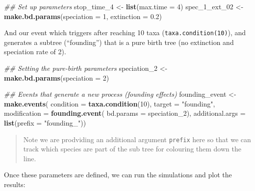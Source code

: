 \documentclass[
]{book}
\newenvironment{Shaded}{\begin{snugshade}}{\end{snugshade}}
\newcommand{\CommentTok}[1]{\textcolor[rgb]{0.56,0.35,0.01}{\textit{#1}}}
\newcommand{\DataTypeTok}[1]{\textcolor[rgb]{0.13,0.29,0.53}{#1}}
\newcommand{\DecValTok}[1]{\textcolor[rgb]{0.00,0.00,0.81}{#1}}
\newcommand{\FloatTok}[1]{\textcolor[rgb]{0.00,0.00,0.81}{#1}}
\newcommand{\KeywordTok}[1]{\textcolor[rgb]{0.13,0.29,0.53}{\textbf{#1}}}
\newcommand{\NormalTok}[1]{#1}
\newcommand{\StringTok}[1]{\textcolor[rgb]{0.31,0.60,0.02}{#1}}
\begin{document}
\begin{Shaded}
\begin{Highlighting}[]
\CommentTok{\#\# Set up parameters}
\NormalTok{stop\_time\_}\DecValTok{4}\NormalTok{ \textless{}{-}}\StringTok{ }\KeywordTok{list}\NormalTok{(}\DataTypeTok{max.time =} \DecValTok{4}\NormalTok{)}
\NormalTok{spec\_}\DecValTok{1}\NormalTok{\_ext\_}\DecValTok{02}\NormalTok{ \textless{}{-}}\StringTok{ }\KeywordTok{make.bd.params}\NormalTok{(}\DataTypeTok{speciation =} \DecValTok{1}\NormalTok{, }\DataTypeTok{extinction =} \FloatTok{0.2}\NormalTok{)}
\end{Highlighting}
\end{Shaded}

And our event which triggers after reaching 10 taxa (\texttt{taxa.condition(10)}), and generates a subtree (``founding'') that is a pure birth tree (no extinction and speciation rate of 2).

\begin{Shaded}
\begin{Highlighting}[]
\CommentTok{\#\# Setting the pure{-}birth parameters}
\NormalTok{speciation\_}\DecValTok{2}\NormalTok{ \textless{}{-}}\StringTok{ }\KeywordTok{make.bd.params}\NormalTok{(}\DataTypeTok{speciation =} \DecValTok{2}\NormalTok{)}

\CommentTok{\#\# Events that generate a new process (founding effects)}
\NormalTok{founding\_event \textless{}{-}}\StringTok{ }\KeywordTok{make.events}\NormalTok{(}
                  \DataTypeTok{condition    =} \KeywordTok{taxa.condition}\NormalTok{(}\DecValTok{10}\NormalTok{),}
                  \DataTypeTok{target       =} \StringTok{"founding"}\NormalTok{,}
                  \DataTypeTok{modification =} \KeywordTok{founding.event}\NormalTok{(}
                                    \DataTypeTok{bd.params =}\NormalTok{ speciation\_}\DecValTok{2}\NormalTok{),}
                  \DataTypeTok{additional.args =} \KeywordTok{list}\NormalTok{(}\DataTypeTok{prefix =} \StringTok{"founding\_"}\NormalTok{))}
\end{Highlighting}
\end{Shaded}

\begin{quote}
Note we are prodviding an additional argument \texttt{prefix} here so that we can track which species are part of the sub tree for colouring them down the line.
\end{quote}

Once these parameters are defined, we can run the simulations and plot the results:
\end{document}
